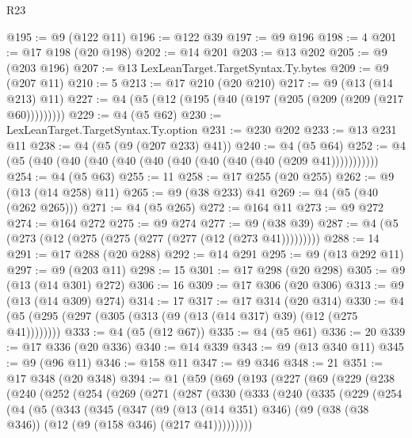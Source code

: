 \begin{lexlean}{R23}
\begin{coremodule}
{{{{{{{{{{{{{{{{{{{{{{{{{{{{{{{{{{{{{{{{{{{{{{{{{{{{{{{{{{{{{{{{{{{{{{{{{{{{{{{{{{{{{{{{{{{{{@195 := @9 (@122 @11)
@196 := @122 @39
@197 := @9 @196
@198 := 4
@201 := @17 @198 (@20 @198)
@202 := @14 @201
@203 := @13 @202
@205 := @9 (@203 @196)
@207 := @13 LexLeanTarget.TargetSyntax.Ty.bytes
@209 := @9 (@207 @11)
@210 := 5
@213 := @17 @210 (@20 @210)
@217 := @9 (@13 (@14 @213) @11)
@227 := @4 (@5 (@12 (@195 (@40 (@197 (@205 (@209 (@209 (@217 @60)))))))))
@229 := @4 (@5 @62)
@230 := LexLeanTarget.TargetSyntax.Ty.option
@231 := @230 @202
@233 := @13 @231 @11
@238 := @4 (@5 (@9 (@207 @233) @41))
@240 := @4 (@5 @64)
@252 := @4 (@5 (@40 (@40 (@40 (@40 (@40 (@40 (@40 (@40 (@40 (@209 @41)))))))))))
@254 := @4 (@5 @63)
@255 := 11
@258 := @17 @255 (@20 @255)
@262 := @9 (@13 (@14 @258) @11)
@265 := @9 (@38 @233) @41
@269 := @4 (@5 (@40 (@262 @265)))
@271 := @4 (@5 @265)
@272 := @164 @11
@273 := @9 @272
@274 := @164 @272
@275 := @9 @274
@277 := @9 (@38 @39)
@287 := @4 (@5 (@273 (@12 (@275 (@275 (@277 (@277 (@12 (@273 @41)))))))))
@288 := 14
@291 := @17 @288 (@20 @288)
@292 := @14 @291
@295 := @9 (@13 @292 @11)
@297 := @9 (@203 @11)
@298 := 15
@301 := @17 @298 (@20 @298)
@305 := @9 (@13 (@14 @301) @272)
@306 := 16
@309 := @17 @306 (@20 @306)
@313 := @9 (@13 (@14 @309) @274)
@314 := 17
@317 := @17 @314 (@20 @314)
@330 := @4 (@5 (@295 (@297 (@305 (@313 (@9 (@13 (@14 @317) @39) (@12 (@275 @41))))))))
@333 := @4 (@5 (@12 @67))
@335 := @4 (@5 @61)
@336 := 20
@339 := @17 @336 (@20 @336)
@340 := @14 @339
@343 := @9 (@13 @340 @11)
@345 := @9 (@96 @11)
@346 := @158 @11
@347 := @9 @346
@348 := 21
@351 := @17 @348 (@20 @348)
@394 := @1
    (@59
      (@69
        (@193
          (@227
            (@69
              (@229
                (@238
                  (@240
                    (@252
                      (@254
                        (@269
                          (@271
                            (@287
                              (@330
                                (@333
                                  (@240
                                    (@335
                                      (@229
                                        (@254
                                          (@4
                                            (@5
                                              (@343
                                                (@345
                                                  (@347
                                                    (@9
                                                      (@13 (@14 @351) @346)
                                                      (@9
                                                        (@38 (@38 @346))
                                                        (@12 (@9 (@158 @346) (@217 @41)))))))))
}}}}}}}}}}}}}}}}}}}}}}}}}}}}}}}}}}}}}}}}}}}}}}}}}}}}}}}}}}}}}}}}}}}}}}}}}}}}}}}}}}}}}}}}}}}}}
\end{coremodule}
\end{lexlean}
